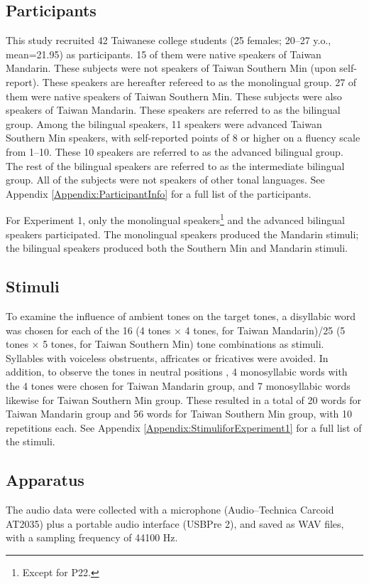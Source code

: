 \documentclass[12pt]{report}
\begin{document}
\begin{CJK}{UTF8}{bsmi}
\subsection{Participants}

This study recruited 42 Taiwanese college students (25 females; 20–27 y.o., mean=21.95) as participants. 15 of them were native speakers of Taiwan Mandarin. These subjects were not speakers of Taiwan Southern Min (upon self-report). These speakers are hereafter refereed to as the monolingual group. 27 of them were native speakers of Taiwan Southern Min. These subjects were also speakers of Taiwan Mandarin. These speakers are referred to as the bilingual group. Among the bilingual speakers, 11 speakers were advanced Taiwan Southern Min speakers, with self-reported points of 8 or higher on a fluency scale from 1–10. These 10 speakers are referred to as the advanced bilingual group. The rest of the bilingual speakers are referred to as the intermediate bilingual group. All of the subjects were not speakers of other tonal languages. See Appendix \ref{Appendix:ParticipantInfo} for a full list of the participants. 

For Experiment 1, only the monolingual speakers\footnote{Except for P22.} and the advanced bilingual speakers participated. The monolingual speakers produced the Mandarin stimuli; the bilingual speakers produced both the Southern Min and Mandarin stimuli.

\subsection{Stimuli}
To examine the influence of ambient tones on the target tones, a disyllabic word was chosen for each of the 16 (4 tones × 4 tones, for Taiwan Mandarin)/25 (5 tones × 5 tones\footnotemark, for Taiwan Southern Min) tone combinations as stimuli. Syllables with voiceless obstruents, affricates or fricatives were avoided. In addition, to observe the tones in neutral positions , 4 monosyllabic words with the 4 tones were chosen for Taiwan Mandarin group, and 7 monosyllabic words likewise for Taiwan Southern Min group. These resulted in a total of 20 words for Taiwan Mandarin group and 56 words for Taiwan Southern Min group, with 10 repetitions each. See Appendix \ref{Appendix:StimuliforExperiment1} for a full list of the stimuli.


\subsection{Apparatus}
The audio data were collected with a microphone (Audio–Technica Carcoid AT2035) plus a portable audio interface (USBPre 2), and saved as WAV files, with a sampling frequency of 44100 Hz.


\end{CJK}
\end{document}
